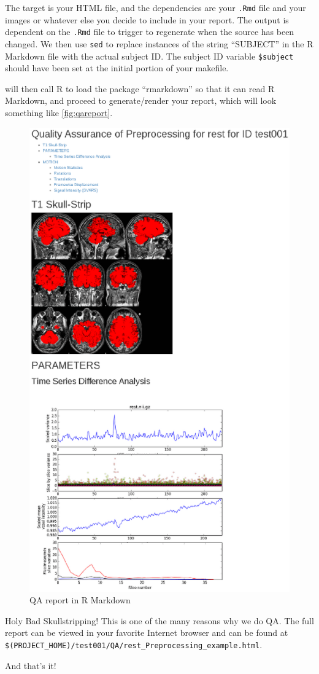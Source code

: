 The target is your HTML file, and the dependencies are your \texttt{.Rmd} file and your images or whatever else you decide to include in your report. The output is dependent on the \texttt{.Rmd} file to trigger to regenerate when the source has been changed. We then use \texttt{sed} to replace instances of the string ``SUBJECT'' in the R Markdown file with the actual subject ID. The subject ID variable \texttt{\$subject} should have been set at the initial portion of your makefile. 

\maken{} will then call R to load the package ``rmarkdown'' so that it can read R Markdown, and proceed to generate/render your report, which will look something like \autoref{fig:qareport}. 

\begin{figure}
	\begin{center}
		\includegraphics[scale=.6]{images/QAcropped.eps}
		\caption{QA report in R Markdown}
		                \label{fig:qareport}
	\end{center}
\end{figure}

Holy Bad Skullstripping! This is one of the many reasons why we do QA. The full report can be viewed in your favorite Internet browser and can be found at \texttt{\$(PROJECT\_HOME)/test001/QA/rest\_Preprocessing\_example.html}. 
 
And that's it! 





